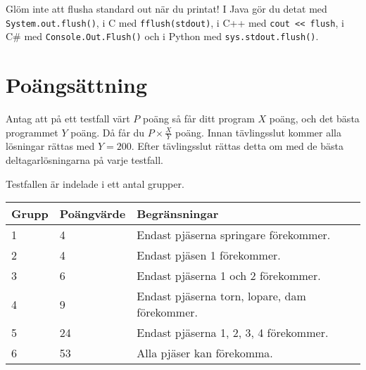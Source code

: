 Glöm inte att flusha standard out när du printat! I Java gör du detat med \texttt{System.out.flush()},
i C med \texttt{fflush(stdout)}, i C++ med \texttt{cout << flush}, i C\# med \texttt{Console.Out.Flush()}
och i Python med \texttt{sys.stdout.flush()}.

\section*{Poängsättning}
Antag att på ett testfall värt $P$ poäng så får ditt program $X$ poäng, och det bästa programmet $Y$ poäng.
Då får du $P \times \frac{X}{Y}$ poäng. Innan tävlingsslut kommer alla lösningar rättas med $Y = 200$.
Efter tävlingsslut rättas detta om med de bästa deltagarlösningarna på varje testfall.

Testfallen är indelade i ett antal grupper.

\begin{tabular}{| l | l | l |}
	\hline
	Grupp & Poängvärde & Begränsningar\\ \hline
  1     & 4          & Endast pjäserna springare förekommer. \\ \hline
  2     & 4          & Endast pjäsen 1 förekommer. \\ \hline
  3     & 6          & Endast pjäserna 1 och 2 förekommer. \\ \hline
  4     & 9          & Endast pjäserna torn, lopare, dam förekommer. \\ \hline
  5     & 24          & Endast pjäserna 1, 2, 3, 4 förekommer. \\ \hline
  6     & 53          & Alla pjäser kan förekomma. \\ \hline
\end{tabular}
